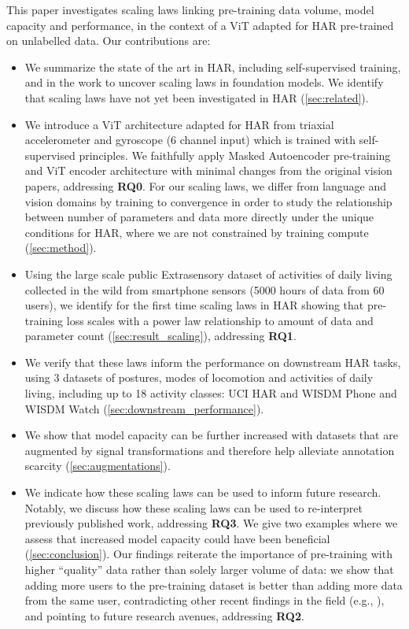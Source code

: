 This paper investigates scaling laws linking pre-training data volume, model capacity and performance, in the context of a ViT adapted for HAR pre-trained on unlabelled data.
%
Our contributions are:
\begin{itemize}
\item 
We summarize the state of the art in HAR, including self-supervised training, and in the work to uncover scaling laws in foundation models. We identify that scaling laws have not yet been investigated in HAR (\cref{sec:related}).
\item 
We introduce a ViT architecture adapted for HAR from triaxial accelerometer and gyroscope (6 channel input) which is trained with self-supervised principles. We faithfully apply Masked Autoencoder pre-training and ViT encoder architecture with minimal changes from the original vision papers, addressing \textbf{RQ0}. For our scaling laws, we differ from language and vision domains by training to convergence in order to study the relationship between number of parameters and data more directly under the unique conditions for HAR, where we are not constrained by training compute (\cref{sec:method}).
\item 
Using the large scale public Extrasensory dataset of activities of daily living collected in the wild from smartphone sensors (5000 hours of data from 60 users), we identify for the first time scaling laws in HAR showing that pre-training loss scales with a power law relationship to amount of data and parameter count (\cref{sec:result_scaling}), addressing \textbf{RQ1}.
\item 
We verify that these laws inform the performance on downstream HAR tasks, using 3 datasets of postures, modes of locomotion and activities of daily living, including up to 18 activity classes: UCI HAR and WISDM Phone and WISDM Watch (\cref{sec:downstream_performance}).
\item 
We show that model capacity can be further increased with datasets that are augmented by signal transformations and therefore help alleviate annotation scarcity (\cref{sec:augmentations}).
\item 
We indicate how these scaling laws can be used to inform future research.
Notably, we discuss how these scaling laws can be used to re-interpret previously published work, addressing \textbf{RQ3}. We give two examples where we assess that increased model capacity could have been beneficial (\cref{sec:conclusion}).
Our findings reiterate the importance of pre-training with higher ``quality'' data rather than solely larger volume of data: we show that adding more users to the pre-training dataset is better than adding more data from the same user, contradicting other recent findings in the field (e.g., \citet{narayanswamy2024scalingwearablefoundationmodels}), and pointing to future research avenues, addressing \textbf{RQ2}.
\end{itemize}

